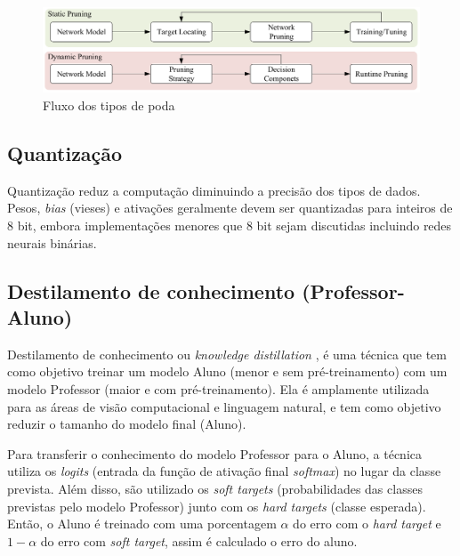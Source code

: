 \begin{figure}[htb]
	\caption {\label{cap_conceitos_tipos_poda}Fluxo dos tipos de poda}
	\begin{center}
		\includegraphics[scale=0.5]{Imagens/categorias-poda}
	\end{center}
\end{figure}

\subsection{Quantização}\label{quantizacao}

Quantização reduz a computação diminuindo a precisão dos tipos de dados. Pesos, \textit{bias} (vieses) e ativações
geralmente devem ser quantizadas para inteiros de 8 bit, embora implementações menores que 8 bit sejam discutidas
incluindo redes neurais binárias. \cite{LIANG2021370}

\subsection{Destilamento de conhecimento (Professor-Aluno)}\label{conceitos_destilamento}

Destilamento de conhecimento ou \textit{knowledge distillation} \cite{hinton2015distilling}, é uma técnica que tem
como objetivo treinar um modelo Aluno (menor e sem pré-treinamento) com um modelo Professor
(maior e com pré-treinamento). Ela é amplamente utilizada para as áreas de visão computacional e linguagem natural,
e tem como objetivo reduzir o tamanho do modelo final (Aluno).

Para transferir o conhecimento do modelo Professor para o Aluno, a técnica utiliza os \textit{logits} (entrada da
função de ativação final \textit{softmax}) no lugar da classe prevista. Além disso, são utilizado os
\textit{soft targets} (probabilidades das classes previstas pelo modelo Professor) junto com os
\textit{hard targets} (classe esperada). Então, o Aluno é treinado com uma porcentagem $\alpha$ do erro com o
\textit{hard target} e $1 - \alpha$ do erro com \textit{soft target}, assim é calculado o erro do aluno.

